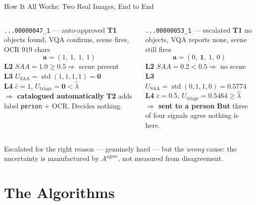 \documentclass[aspectratio=169,11pt]{beamer}
\begin{document}
\begin{frame}{How It All Works: Two Real Images, End to End}
\scriptsize
\begin{columns}[T]
\begin{exampleblock}{\scriptsize \texttt{...00000047\_1} --- auto-approved}
\scriptsize
\textbf{T1} objects found, VQA confirms, scene fires, OCR $919$ chars
\[ \mathbf{a} = (1,\ 1,\ 1,\ 1) \]
\textbf{L2} $SAA = \mathbf{1.0} \ge 0.5 \Rightarrow$ scene present \\
\textbf{L3} $U_{\text{SAA}} = \operatorname{std}(1,1,1,1) = \mathbf{0}$ \\
\textbf{L4} $\bar c = 1$, $U_{\text{triage}} = \mathbf{0} < \hat\lambda$ \\
$\Rightarrow$ \textbf{catalogued automatically}
\vskip 2pt
\textbf{T2} adds label \texttt{person} + OCR. Decides nothing.
\end{exampleblock}

\begin{alertblock}{\scriptsize \texttt{...00000053\_1} --- escalated}
\scriptsize
\textbf{T1} no objects, VQA reports none, scene still fires
\[ \mathbf{a} = (0,\ \mathbf{1},\ 1,\ 0) \]
\textbf{L2} $SAA = \mathbf{0.2} < 0.5 \Rightarrow$ no scene \\
\textbf{L3} $U_{\text{SAA}} = \operatorname{std}(0,1,1,0) = \mathbf{0.5774}$ \\
\textbf{L4} $\bar c = 0.5$, $U_{\text{triage}} = \mathbf{0.5464} \ge \hat\lambda$ \\
$\Rightarrow$ \textbf{sent to a person}
\vskip 2pt
\textbf{But} three of four signals agree nothing is here.
\end{alertblock}
\end{columns}
\vspace{-0.5mm}
\footnotesize Escalated for the right reason --- genuinely hard --- but the \emph{wrong} cause: the uncertainty is manufactured by $A^{\text{agree}}$, not measured from disagreement.
\end{frame}

\section{The Algorithms}
\end{document}
